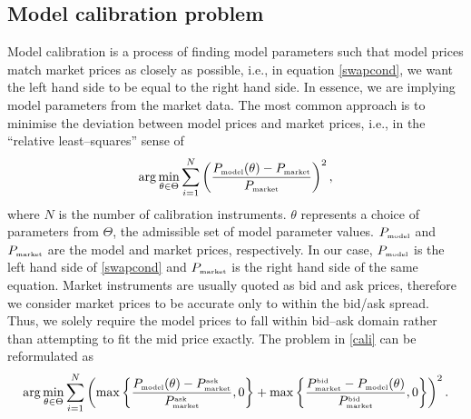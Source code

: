\documentclass[12pt,a4paper]{article}
\theoremstyle{plain}
\numberwithin{equation}{section}
\begin{document}
\subsection{Model calibration problem}
Model calibration is a process of finding model parameters such that model
prices match market prices as closely as possible, i.e., in equation \eqref{swapcond}, we want the left hand side to be equal to the right hand side. In essence, we are implying model parameters from the market data. The most common approach is to minimise the deviation between model prices and market prices, i.e., in the ``relative least--squares'' sense of
\begin{eqnarray}\label{cali}
\arg \min_{\theta\in\Theta} \sum_{i=1}^N \left(\frac{P_{\tiny \mbox{model}}(\theta)-P_{\tiny \mbox{market}}}{P_{\tiny \mbox{market}}}\right)^2,
\end{eqnarray}
where $N$ is the number of calibration instruments. $\theta$ represents a choice of parameters from $\Theta$, the admissible set of model parameter values. $P_{\tiny \mbox{model}}$ and $P_{\tiny \mbox{market}}$ are the model and market prices, respectively. In our case, $P_{\tiny \mbox{model}}$ is the left hand side of \eqref{swapcond} and $P_{\tiny \mbox{market}}$ is the right hand side of the same equation. Market instruments are usually quoted as bid and ask prices, therefore we consider market prices to be accurate only to within the bid/ask spread. Thus, we solely require the model prices to fall within bid--ask domain rather than attempting to fit the mid price exactly. The problem in \eqref{cali} can be reformulated as
\begin{eqnarray}\label{bidask}
\arg \min_{\theta\in\Theta} \sum_{i=1}^N \left(\max\left\{\frac{P_{\tiny \mbox{model}}(\theta)-P_{\tiny \mbox{market}}^{\tiny \mbox{ask}}}{P_{\tiny \mbox{market}}^{\tiny \mbox{ask}}},0\right\}+\max\left\{\frac{P_{\tiny \mbox{market}}^{\tiny \mbox{bid}}-P_{\tiny \mbox{model}}(\theta)}{P_{\tiny \mbox{market}}^{\tiny \mbox{bid}}},0\right\}\right)^2.
\end{eqnarray}
\end{document}
